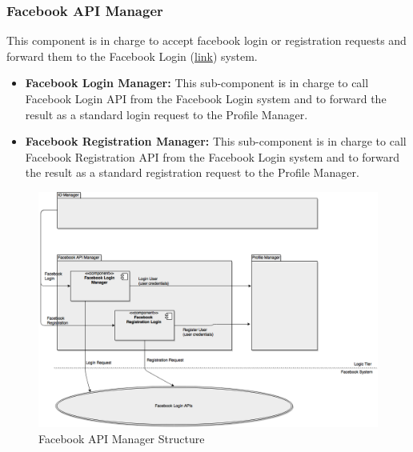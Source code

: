\documentclass[../../../../../../../dd.tex]{subfiles}
\begin{document}
	\subsubsection{Facebook API Manager}
		This component is in charge to accept facebook login or registration requests and forward them to the Facebook Login (\href{https://developers.facebook.com/docs/facebook-login/}{link}) system.
		\begin{itemize}

			\item \textbf{Facebook Login Manager:} This sub-component is in charge to call Facebook Login API from the Facebook Login system and to forward the result as a standard login request to the Profile Manager.

			\item \textbf{Facebook Registration Manager:} This sub-component is in charge to call Facebook Registration API from the Facebook Login system and to forward the result as a standard registration request to the Profile Manager.

		\end{itemize}
		
		\begin{figure}[H]
				\centering
				\includegraphics[width=\textwidth, scale=0.5]{../images/FacebookAPIManager.png}
			\caption{Facebook API Manager Structure}\label{fig:FacebookAPIManager}
		\end{figure}
	
\end{document}
